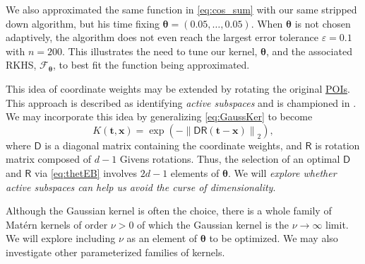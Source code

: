 \documentclass[11pt]{NSFamsart}
\newcommand{\Upara}[1]{\noindent\underline{\upshape #1}:}
\newcommand{\POIs}{\hyperlink{POIlink}{POIs}\xspace}
\DeclareMathOperator{\STREND}{ST} %
\newcommand{\mD}{\mathsf{D}}
\newcommand{\mR}{\mathsf{R}}
\newcommand{\bx}{{\boldsymbol{x}}}
\newcommand{\bt}{{\boldsymbol{t}}}
\newcommand{\btheta}{{\boldsymbol{\theta}}}
\newcommand{\calf}{{\mathcal{F}}}
\newcommand{\calp}{{\mathcal{P}}}
\newcommand{\norm}[2][{}]{\ensuremath{\left \lVert #2 \right \rVert}_{#1}}
\begin{document}
We also approximated the same function in \eqref{eq:cos_sum} with our same stripped down algorithm, but his time fixing $\btheta = (0.05, \ldots, 0.05)$. When $\btheta$ is not chosen adaptively, the algorithm does not even reach the largest error tolerance $\varepsilon = 0.1$ with $n = 200$. This illustrates the need to tune our kernel, $\btheta$, and the associated RKHS, $\calf_\btheta$, to best fit the function being approximated.

This idea of coordinate weights may be extended by rotating the original \POIs. This approach is described as identifying \emph{active subspaces} and is championed in \cite{constantine2015active}. We may incorporate this idea by generalizing \eqref{eq:GaussKer} to become 
\begin{equation} \label{eq:multisqExpD}
	K(\bt,\bx) = \exp(-\norm[2]{\mD \mR(\bt-\bx)}), 
\end{equation}
where $\mD$ is a diagonal matrix containing the coordinate weights, and $\mR$ is rotation matrix composed of $d-1$ Givens rotations.  Thus, the selection of an optimal $\mD$ and $\mR$ via \eqref{eq:thetEB}  involves $2d-1$  elements of $\btheta$.  We will \emph{explore whether active subspaces can help us avoid the curse of dimensionality}.

Although the Gaussian kernel is often the choice, there is a whole family of Mat\'ern kernels of order $\nu >0$ of which the Gaussian kernel is the $\nu \to \infty$ limit.  We will explore including $\nu$ as an element of $\btheta$ to be optimized.  We may also investigate other parameterized families of kernels.

\end{document}
